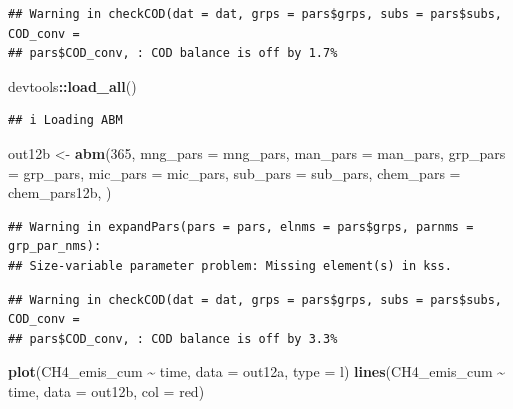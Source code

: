 \documentclass[
]{article}
\newenvironment{Shaded}{\begin{snugshade}}{\end{snugshade}}
\newcommand{\AttributeTok}[1]{\textcolor[rgb]{0.13,0.29,0.53}{#1}}
\newcommand{\DecValTok}[1]{\textcolor[rgb]{0.00,0.00,0.81}{#1}}
\newcommand{\FunctionTok}[1]{\textcolor[rgb]{0.13,0.29,0.53}{\textbf{#1}}}
\newcommand{\NormalTok}[1]{#1}
\newcommand{\OtherTok}[1]{\textcolor[rgb]{0.56,0.35,0.01}{#1}}
\newcommand{\SpecialCharTok}[1]{\textcolor[rgb]{0.81,0.36,0.00}{\textbf{#1}}}
\newcommand{\StringTok}[1]{\textcolor[rgb]{0.31,0.60,0.02}{#1}}
\begin{document}
\begin{verbatim}
## Warning in checkCOD(dat = dat, grps = pars$grps, subs = pars$subs, COD_conv =
## pars$COD_conv, : COD balance is off by 1.7%
\end{verbatim}

\begin{Shaded}
\begin{Highlighting}[]
\NormalTok{devtools}\SpecialCharTok{::}\FunctionTok{load\_all}\NormalTok{()}
\end{Highlighting}
\end{Shaded}

\begin{verbatim}
## i Loading ABM
\end{verbatim}

\begin{Shaded}
\begin{Highlighting}[]
\NormalTok{out12b }\OtherTok{\textless{}{-}} \FunctionTok{abm}\NormalTok{(}\DecValTok{365}\NormalTok{,}
             \AttributeTok{mng\_pars =}\NormalTok{ mng\_pars,}
             \AttributeTok{man\_pars =}\NormalTok{ man\_pars,}
             \AttributeTok{grp\_pars =}\NormalTok{ grp\_pars,}
             \AttributeTok{mic\_pars =}\NormalTok{ mic\_pars,}
             \AttributeTok{sub\_pars =}\NormalTok{ sub\_pars,}
             \AttributeTok{chem\_pars =}\NormalTok{ chem\_pars12b,}
\NormalTok{)}
\end{Highlighting}
\end{Shaded}

\begin{verbatim}
## Warning in expandPars(pars = pars, elnms = pars$grps, parnms = grp_par_nms):
## Size-variable parameter problem: Missing element(s) in kss.
\end{verbatim}

\begin{verbatim}
## Warning in checkCOD(dat = dat, grps = pars$grps, subs = pars$subs, COD_conv =
## pars$COD_conv, : COD balance is off by 3.3%
\end{verbatim}

\begin{Shaded}
\begin{Highlighting}[]
\FunctionTok{plot}\NormalTok{(CH4\_emis\_cum }\SpecialCharTok{\textasciitilde{}}\NormalTok{ time, }\AttributeTok{data =}\NormalTok{ out12a, }\AttributeTok{type =} \StringTok{\textquotesingle{}l\textquotesingle{}}\NormalTok{)}
\FunctionTok{lines}\NormalTok{(CH4\_emis\_cum }\SpecialCharTok{\textasciitilde{}}\NormalTok{ time, }\AttributeTok{data =}\NormalTok{ out12b, }\AttributeTok{col =} \StringTok{\textquotesingle{}red\textquotesingle{}}\NormalTok{)}
\end{Highlighting}
\end{Shaded}
\end{document}
